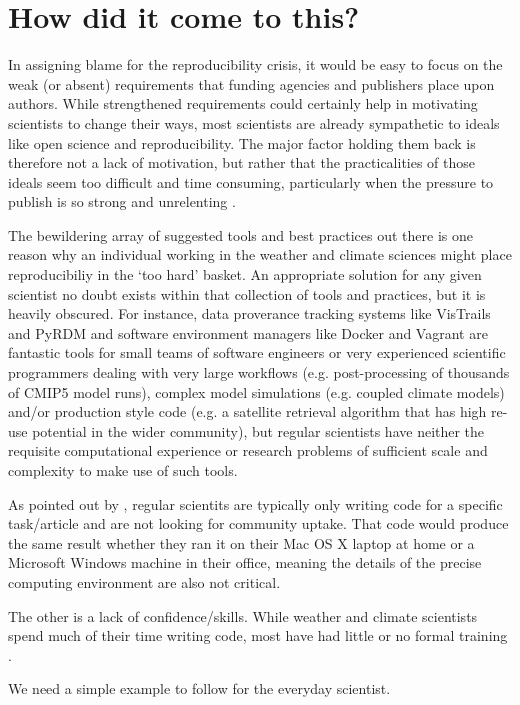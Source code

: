 \section{How did it come to this?}

In assigning blame for the reproducibility crisis, it would be easy to focus on the weak (or absent) requirements that funding agencies and publishers place upon authors. While strengthened requirements could certainly help in motivating scientists to change their ways, most scientists are already sympathetic to ideals like open science and reproducibility. The major factor holding them back is therefore not a lack of motivation, but rather that the practicalities of those ideals seem too difficult and time consuming, particularly when the pressure to publish is so strong and unrelenting \citep[e.g.][]{Stodden2010}. 

The bewildering array of suggested tools and best practices out there is one reason why an individual working in the weather and climate sciences might place reproducibiliy in the `too hard' basket. An appropriate solution for any given scientist no doubt exists within that collection of tools and practices, but it is heavily obscured. For instance, data proverance tracking systems like VisTrails \citep{Freire2012} and PyRDM \citep{Jacobs2014} and software environment managers like Docker and Vagrant \citep{Stodden2014} are fantastic tools for small teams of software engineers or very experienced scientific programmers dealing with very large workflows (e.g. post-processing of thousands of CMIP5 model runs), complex model simulations (e.g. coupled climate models) and/or production style code (e.g. a satellite retrieval algorithm that has high re-use potential in the wider community), but regular scientists have neither the requisite computational experience or research problems of sufficient scale and complexity to make use of such tools.       

As pointed out by \citet{Easterbrook2014}, regular scientits are typically only writing code for a specific task/article and are not looking for community uptake. That code would produce the same result whether they ran it on their Mac OS X laptop at home or a Microsoft Windows machine in their office, meaning the details of the precise computing environment are also not critical.

The other is a lack of confidence/skills. While weather and climate scientists spend much of their time writing code, most have had little or no formal training \citet{Hannay2009}.   


We need a simple example to follow for the everyday scientist.